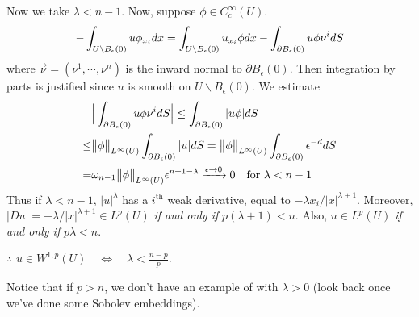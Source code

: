 \documentclass[10pt,a4paper]{report}
\begin{document}
\quad Now we take $\lambda < n-1$. Now, suppose $\phi \in C^{\infty}_c(U)$.
\begin{align*}
-\int_{U \backslash B_{\epsilon}(0)} u\phi_{x_i} dx = \int_{U \backslash B_{\epsilon}(0)} u_{x_i} \phi dx - \int_{\partial B_{\epsilon}(0)} u \phi \nu^i dS
\end{align*}
where $\vec{\nu} = (\nu^1, \cdots, \nu^n)$ is the inward normal to $\partial B_{\epsilon}(0)$. Then integration by parts is justified since $u$ is smooth on $U \backslash B_{\epsilon}(0)$. We estimate
\begin{align*}
& \Big| \int_{\partial B_{\epsilon}(0)} u\phi \nu^i dS \Big| \leq \int_{\partial B_{\epsilon}(0)} |u\phi| dS \\
\leq & \bigl\lVert\phi\bigr\rVert_{L^{\infty}(U)} \int_{\partial B_{\epsilon}(0)} |u| dS = \bigl\lVert\phi\bigr\rVert_{L^{\infty}(U)} \int_{\partial B_{\epsilon}(0)} \epsilon^{-d} dS \\
= & \omega_{n-1} \bigl\lVert\phi\bigr\rVert_{L^{\infty}(U)} \epsilon^{n+1-\lambda} \xrightarrow{\epsilon \rightarrow 0} 0 \quad \text{for } \lambda < n-1
\end{align*}
Thus if $\lambda < n-1$, $|u|^{\lambda}$ has a $i^{\text{th}}$ weak derivative, equal to $-\lambda x_i /|x|^{\lambda+1}$. Moreover, $|Du| = -\lambda / |x|^{\lambda +1} \in L^p(U)$ \emph{if and only if} $p(\lambda +1) <n$. Also, $u\in L^p(U)$ \emph{if and only if} $p\lambda <n$.

\quad $\therefore$ $u\in W^{1,p}(U) \quad \Leftrightarrow \quad \lambda < \frac{n-p}{p}$.
\s

Notice that if $p>n$, we don't have an example of with $\lambda >0$ (look back once we've done some Sobolev embeddings).
\s
\end{document}
